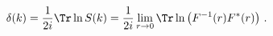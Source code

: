 \begin{equation}
\delta(k) = \frac{1}{2i}\Tr \ln S(k) = 
\frac{1}{2i}\lim_{r\rightarrow 0}\Tr\ln \left( F^{-1}(r)F^{*}(r) 
\right) \, .
\end{equation}

